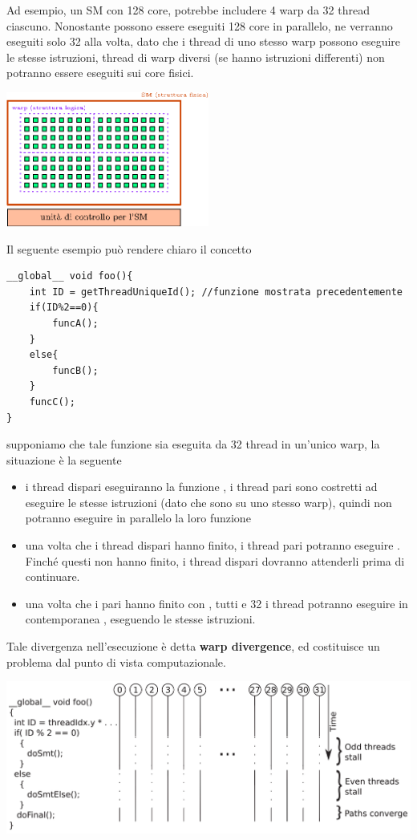 \documentclass[10pt, letterpaper]{report}
\begin{document}
Ad esempio, un SM con 128 core, potrebbe includere 4 warp da 32 thread ciascuno. Nonostante possono essere eseguiti 128 core in parallelo, ne verranno eseguiti solo 32 alla volta, dato che i thread di uno stesso warp possono eseguire le stesse istruzioni, thread di warp diversi (se hanno istruzioni differenti) non potranno essere eseguiti sui core fisici.\begin{center}
    \includegraphics[width=0.5\textwidth ]{images/warp.eps}
\end{center}
Il seguente esempio può rendere chiaro il concetto
\begin{lstlisting}[style=CStyle]
__global__ void foo(){
    int ID = getThreadUniqueId(); //funzione mostrata precedentemente 
    if(ID%2==0){
        funcA();
    }
    else{
        funcB();
    }
    funcC();
}
\end{lstlisting}
supponiamo che tale funzione  sia eseguita da 32 thread in un'unico warp, la situazione è la seguente\begin{itemize}
    \item i thread dispari eseguiranno la funzione , i thread pari sono costretti ad eseguire le stesse istruzioni (dato che sono su uno stesso warp), quindi non potranno eseguire in parallelo la loro funzione 
    \item una volta che i thread dispari hanno finito, i thread pari potranno eseguire . Finché questi non hanno finito, i thread dispari dovranno attenderli prima di continuare. 
    \item una volta che i pari hanno finito con , tutti e 32 i thread potranno eseguire in contemporanea  , eseguendo le stesse istruzioni.
\end{itemize}
Tale divergenza nell'esecuzione è detta \textbf{warp divergence}, ed costituisce un problema dal punto di vista computazionale.\begin{center}
    \includegraphics[width=\textwidth ]{images/warpDivergence.png}
\end{center}
\end{document}

